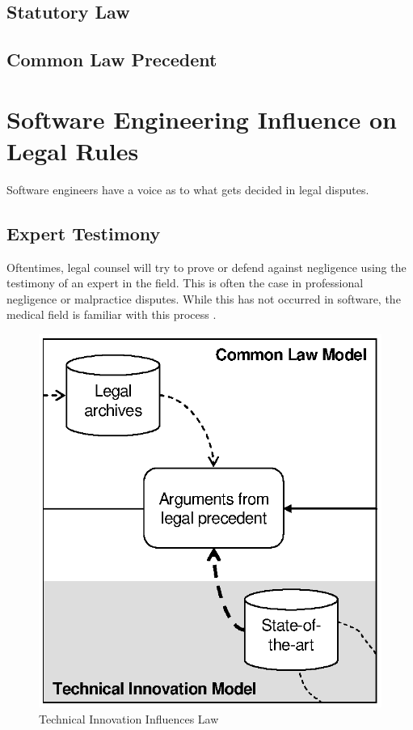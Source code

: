 \subsection{Statutory Law}
\subsection{Common Law Precedent}

\section{Software Engineering Influence on Legal Rules}

Software engineers have a voice as to what gets decided in legal disputes.

\subsection{Expert Testimony}

Oftentimes, legal counsel will try to prove or defend against negligence using
the testimony of an expert in the field. This is often the case in professional
negligence or malpractice disputes. While this has not occurred in software, the
medical field is familiar with this process \cite{Deitschel02}.

\begin{figure}[t]
\begin{center}
\includegraphics{figures/TechOnLaw.eps}
\end{center}
\caption{Technical Innovation Influences Law}
\label{fig:TechOnLaw}
\end{figure}

